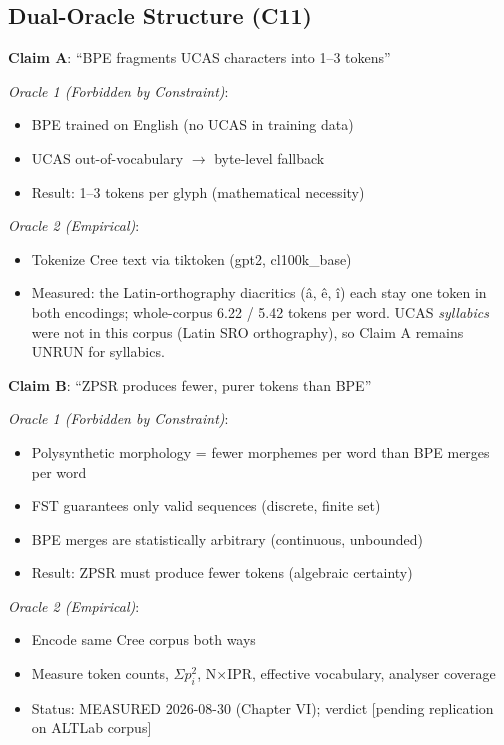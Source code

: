 \documentclass[11pt,oneside]{article}
\begin{document}
\subsection{Dual-Oracle Structure (C11)}

\textbf{Claim A}: ``BPE fragments UCAS characters into 1--3 tokens''

\emph{Oracle 1 (Forbidden by Constraint)}:
\begin{itemize}
  \item BPE trained on English (no UCAS in training data)
  \item UCAS out-of-vocabulary $\to$ byte-level fallback
  \item Result: 1--3 tokens per glyph (mathematical necessity)
\end{itemize}

\emph{Oracle 2 (Empirical)}:
\begin{itemize}
  \item Tokenize Cree text via tiktoken (gpt2, cl100k\_base)
  \item Measured: the Latin-orthography diacritics (â, ê, î) each stay one token in both encodings; whole-corpus 6.22 / 5.42 tokens per word. UCAS \emph{syllabics} were not in this corpus (Latin SRO orthography), so Claim A remains UNRUN for syllabics.
\end{itemize}

\textbf{Claim B}: ``ZPSR produces fewer, purer tokens than BPE''

\emph{Oracle 1 (Forbidden by Constraint)}:
\begin{itemize}
  \item Polysynthetic morphology = fewer morphemes per word than BPE merges per word
  \item FST guarantees only valid sequences (discrete, finite set)
  \item BPE merges are statistically arbitrary (continuous, unbounded)
  \item Result: ZPSR must produce fewer tokens (algebraic certainty)
\end{itemize}

\emph{Oracle 2 (Empirical)}:
\begin{itemize}
  \item Encode same Cree corpus both ways
  \item Measure token counts, $\Sigma p_i^2$, N×IPR, effective vocabulary, analyser coverage
  \item Status: MEASURED 2026-08-30 (Chapter VI); verdict [pending replication on ALTLab corpus]
\end{itemize}
\end{document}
